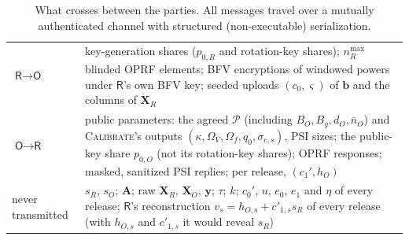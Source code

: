 \documentclass[11pt]{article}
\theoremstyle{definition}
\theoremstyle{plain}
\newcommand{\bXR}{\mathbf{X}_{R}}
\newcommand{\bXO}{\mathbf{X}_{O}}
\newcommand{\by}{\mathbf{y}}
\newcommand{\bb}{\mathbf{b}}
\newcommand{\bA}{\mathbf{A}}
\newcommand{\dXR}{\dot{\mathbf{X}}_{R}}
\newcommand{\Party}[1]{\textsf{#1}}
\newcommand{\Rp}{\Party{R}}
\newcommand{\Op}{\Party{O}}
\begin{document}


\begin{table}[ht]
\centering\small
\caption{What crosses between the parties. All messages travel over a mutually authenticated channel with structured (non-executable) serialization.}
\label{tab:ledger}
\renewcommand{\arraystretch}{1.25}
\begin{tabularx}{\textwidth}{@{}l>{\raggedright\arraybackslash}X@{}}
\toprule
$\Rp \to \Op$ & key-generation shares ($p_{0,R}$ and rotation-key shares); $n_R^{\max}$ blinded OPRF elements; BFV encryptions of windowed powers under $\Rp$'s own BFV key; seeded uploads $(c_0, \varsigma)$ of $\bb$ and the columns of $\dXR$ \\
$\Op \to \Rp$ & public parameters: the agreed $\mathcal P$ (including $B_O, B_y, d_O, \bar n_O$) and \textsc{Calibrate}'s outputs $(\kappa, \Omega_V, \Omega_f, q_0, \sigma_{c,s})$, PSI sizes; the public-key share $p_{0,O}$ (not its rotation-key shares); OPRF responses; masked, sanitized PSI replies; per release, $(c_1', h_O)$ \\
never transmitted & $s_R$, $s_O$; $\bA$; raw $\bXR$, $\bXO$, $\by$; $\tau$; $k$; $c_0'$, $u$, $e_0$, $e_1$ and $\eta$ of every release; $\Rp$'s reconstruction $v_s = h_{O,s} + c'_{1,s}s_R$ of every release (with $h_{O,s}$ and $c'_{1,s}$ it would reveal $s_R$) \\
\bottomrule
\end{tabularx}
\end{table}
\end{document}
